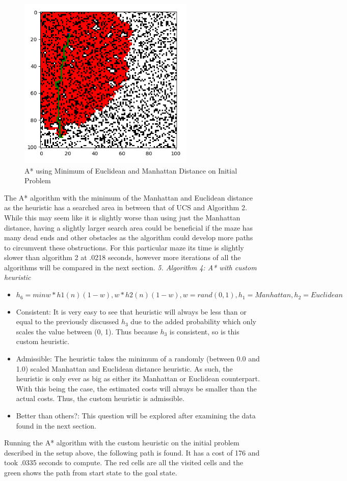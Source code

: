 \documentclass[a4paper]{article}
\begin{document}
\begin{figure}[ht]
    \centering
    \includegraphics[width=0.75\textwidth]{fig5.png}
    \caption{A* using Minimum of Euclidean and Manhattan Distance on Initial Problem}
    \label{fig:h3}
\end{figure}
The A* algorithm with the minimum of the Manhattan and Euclidean distance as the heuristic has a searched area in between that of UCS and Algorithm 2. While this may seem like it is slightly worse than using just the Manhattan distance, having a slightly larger search area could be beneficial if the maze has many dead ends and other obstacles as the algorithm could develop more paths to circumvent these obstructions. For this particular maze its time is slightly slower than algorithm 2 at .0218 seconds, however more iterations of all the algorithms will be compared in the next section.
\newpage
\textit{5. Algorithm 4: A* with custom heuristic}
\begin{itemize}
    \item $h_6 = min{w*h1(n) (1-w), w*h2(n) (1-w)}, w = rand(0, 1), h_1 = Manhattan, h_2 = Euclidean$
    \item Consistent: It is very easy to see that heuristic will always be less than or equal to the previously discussed $h_3$ due to the added probability which only scales the value between (0, 1). Thus because $h_3$ is consistent, so is this custom heuristic.

    \item Admissible: The heuristic takes the minimum of a randomly (between 0.0 and 1.0) scaled Manhattan and Euclidean distance heuristic. As such, the heuristic is only ever as big as either its Manhattan or Euclidean counterpart. With this being the case, the estimated costs will always be smaller than the actual costs. Thus, the custom heuristic is admissible.
    \item Better than others?: This question will be explored after examining the data found in the next section.
\end{itemize}
Running the A* algorithm with the custom heuristic on the initial problem described in the setup above, the following path is found. It has a cost of 176 and took .0335 seconds to compute. The red cells are all the visited cells and the green shows the path from start state to the goal state.
\end{document}

